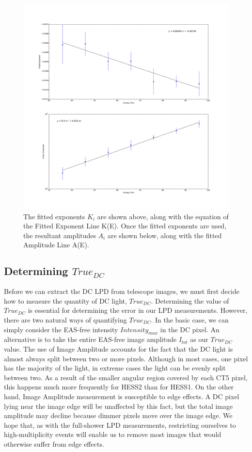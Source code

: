 \documentclass[11pt]{article}
\begin{document}
\begin{figure}
\begin{center}
\includegraphics[width=\textwidth]{lpdpowerlaw}
\caption{The fitted exponents $K_{i}$ are shown above, along with the equation of the Fitted Exponent Line K(E). Once the fitted exponents are used, the resultant amplitudes $A_{i}$ are shown below, along with the fitted Amplitude Line A(E).}
\label{fig:powerlawlpd}
\end{center}
\end{figure}

\subsection{Determining $True_{DC}$}
Before we can extract the DC LPD from telescope images, we must first decide how to measure the quantity of DC light, $True_{DC}$. Determining the value of $True_{DC}$ is essential for determining the error in our LPD measurements. However, there are two natural ways of quantifying $True_{DC}$. In the basic case, we can simply consider the EAS-free intensity $Intensity_{max}$ in the DC pixel. An alternative is to take the entire EAS-free image amplitude $I_{tot}$ as our $True_{DC}$ value. The use of Image Amplitude accounts for the fact that the DC light is almost always split between two or more pixels. Although in most cases, one pixel has the majority of the light, in extreme cases the light can be evenly split between two. As a result of the smaller angular region covered by each CT5 pixel, this happens much more frequently for HESS2 than for HESS1. On the other hand, Image Amplitude measurement is susceptible to edge effects. A DC pixel lying near the image edge will be unaffected by this fact, but the total image amplitude may decline because dimmer pixels move over the image edge. We hope that, as with the full-shower LPD measurements, restricting ourselves to high-multiplicity events will enable us to remove most images that would otherwise suffer from edge effects.
\end{document}
